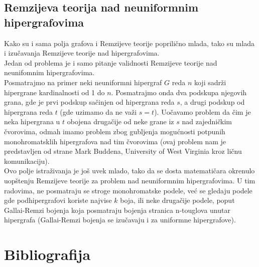 \documentclass[a4paper]{article}
\begin{document}
	\subsection{Remzijeva teorija nad neuniformnim hipergrafovima}\label{neuniformni}
	
	Kako su i sama polja grafova i Remzijeve teorije poprilično mlada, tako su mlada i izučavanja Remzijeve teorije nad hipergrafovima. \\
	Jedan od problema je  i samo pitanje validnosti Remzijeve teorije nad neunifomnim hipergrafovima.\\
	Posmatrajmo na primer neki neuniformni hipergraf $G$ reda $n$ koji sadrži hipergrane kardinalnosti od 1 do $n$. Posmatrajmo onda dva podskupa njegovih grana, gde je prvi podskup sačinjen od  hipergrana reda $s$, a drugi podskup od hipergrana reda $t$ (gde uzimamo da ne važi $s=t$). Uočavamo problem da čim je neka hipergrana u $t$ obojena drugačije od neke grane iz $s$ nad zajedničkim čvorovima, odmah imamo problem zbog gubljenja mogućnosti potpunih monohromatsklih hipergrafova nad tim čvorovima (ovaj problem nam je predstavljen od strane Mark Buddena, University of West Virginia kroz ličnu komunikaciju).  %
	\\Ovo polje istraživanja je još uvek mlado, tako da se dosta matematičara okrenulo uopštenju Remzijeve teorije za problem nad neuniformnim hipergrafovima. U tim radovima, ne posmatraju se stroge monohromatske podele, već se gledaju podele gde podhipergrafovi koriste najvise $k$ boja, ili neke drugačije podele, poput Gallai-Remzi bojenja koja posmatraju bojenja stranica n-touglova unutar hipergrafa (Gallai-Remzi bojenja se izučavaju i za uniformne hipergrafove).
	\pagebreak
	\section{Bibliografija}	
	\printbibliography
\end{document}

